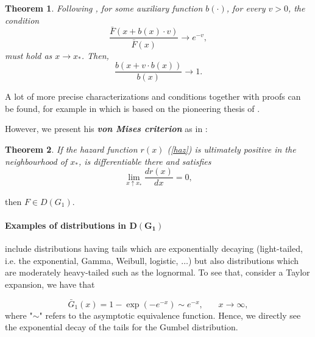 \documentclass[11pt,a4paper,openany ]{book}
\newtheorem{theorem}{Theorem}[chapter]
\begin{document}
\begin{theorem} Following \cite[pp.72]{beirlant_statistics_2006},
	for some auxiliary function $b(\cdot )$, for every $v>0$, the condition
	\begin{equation}
	\frac{\bar{F}(x+b(x)\cdot v)}{\bar{F}(x)} \to e^{-v},
	\end{equation}
	must hold as $x\to x_*$. Then, 
	\begin{equation*}
	\frac{b(x+v\cdot b(x))}{b(x)}\to 1 .
	\end{equation*} 
\end{theorem}

A lot of more precise characterizations and conditions together with proofs can be found, for example in \citet[pp.20-33]{haan_extreme_2006} which is based on the pioneering thesis of \citet{haan_regular_1970-1}. 

However, we present his \emph{\textbf{von Mises criterion}} as in \cite[pp.73]{beirlant_statistics_2006}: 

\begin{theorem} If the hazard function $r(x)$ (\ref{haz})
is ultimately positive in the neighbourhood of $x_*$, is differentiable there and satisfies 
\begin{equation}
\displaystyle{\lim_{x  \uparrow  x_*}} \frac{dr(x)}{dx}=0,
\end{equation}
\end{theorem}

then $F\in D(G_1)$. 

\paragraph*{Examples of distributions in $\boldsymbol{D(G_1)}$} include distributions having tails which are exponentially decaying (light-tailed, i.e. the exponential, Gamma, Weibull, logistic, $\dots$) but also distributions which are moderately heavy-tailed such as the lognormal.
To see that, consider a Taylor expansion, we have that 

\begin{equation*}
\bar{G}_1(x)=1-\exp(-e^{-x})\sim e^{-x}, \ \ \ \ \ \ \ \ x\to\infty,
\end{equation*}
where "$\sim$" refers to the asymptotic equivalence function. Hence, we directly see the exponential decay of the tails for the Gumbel distribution.
\end{document}
